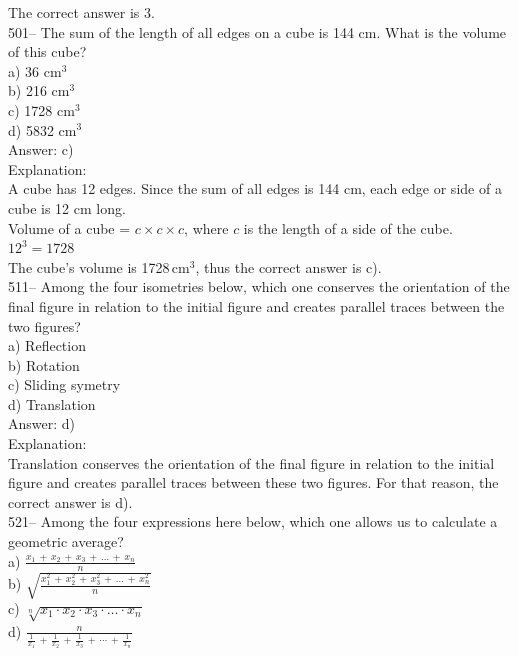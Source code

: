 \documentclass[letterpaper, 12pt]{article}
\begin{document}
The correct answer is 3.\\


501-- The sum of the length of all edges on a cube is 144 cm.
What is the volume of this cube?\\

a) 36 cm$^{3}$\\
b) 216 cm$^{3}$\\
c) 1728 cm$^{3}$\\
d) 5832 cm$^{3}$\\

Answer: c)\\

Explanation:  \\
A cube has 12 edges. Since the sum of all edges is 144 cm, each edge or side of a cube is 12 cm long.\\
Volume of a cube = $c\times c\times c$, where $c$ is the length of a side of the cube.  \\
$12^{3}=1728$\\
The cube's volume is 1728\,cm$^{3}$, thus the correct answer is c).\\


511--  Among the four isometries below, which one conserves the orientation
of the final figure in relation to the initial figure and creates parallel traces
between the two figures?\\

a) Reflection\\
b) Rotation\\
c) Sliding symetry\\
d) Translation\\

Answer: d)\\

Explanation:\\
Translation conserves the orientation of the final figure in relation to the initial figure and
creates parallel traces between these two figures.
For that reason, the correct answer is d).\\


521-- Among the four expressions here below, which one allows us to calculate a
geometric average?\\
a) $\frac{x_1\,+\,x_2\,+\,x_3\,+\,\ldots\,+\,x_n}{n}$\\[2mm]
b)
$\sqrt{\frac{x_1^{2}\,+\,x_2^{2}\,+\,x_3^{2}\,+\,\ldots\,+\,x_n^{2}}{n}}$\\[2mm]
c) $\sqrt[n]{x_1 \cdot x_2 \cdot x_3 \cdot \ldots \cdot x_n}$\\[2mm]
d)
$\frac{n}{\frac{1}{x_1}\,+\,\frac{1}{x_2}\,+\,\frac{1}{x_3}\,+\,\cdots\,+\,\frac{1}{x_n}}$\\
\end{document}
